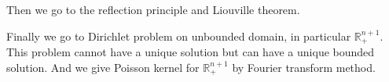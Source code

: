 Then we go to the reflection principle and Liouville theorem.\par
Finally we go to Dirichlet problem on unbounded domain, in particular $\mathbb{R}_+^{n+1}$. This problem cannot have a unique solution but can have
a unique bounded solution. And we give Poisson kernel for $\mathbb{R}_+^{n+1}$ by Fourier transform method.

% 




